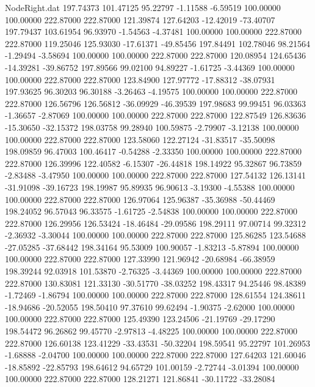 \begin{filecontents}{NodeRight.dat}
 197.74373  101.47125   95.22797    -1.11588   -6.59519  100.00000  100.00000  222.87000  222.87000  121.39874  127.64203  -12.42019  -73.40707
 197.79437  103.61954   96.93970    -1.54563   -4.37481  100.00000  100.00000  222.87000  222.87000  119.25046  125.93030  -17.61371  -49.85456
 197.84491  102.78046   98.21564    -1.29494   -3.58694  100.00000  100.00000  222.87000  222.87000  120.08954  124.65436  -14.39281  -39.86752
 197.89566   99.02100   94.89227    -1.61725   -3.44369  100.00000  100.00000  222.87000  222.87000  123.84900  127.97772  -17.88312  -38.07931
 197.93625   96.30203   96.30188    -3.26463   -4.19575  100.00000  100.00000  222.87000  222.87000  126.56796  126.56812  -36.09929  -46.39539
 197.98683   99.99451   96.03363    -1.36657   -2.87069  100.00000  100.00000  222.87000  222.87000  122.87549  126.83636  -15.30650  -32.15372
 198.03758   99.28940  100.59875    -2.79907   -3.12138  100.00000  100.00000  222.87000  222.87000  123.58060  122.27124  -31.83517  -35.50098
 198.09859   96.47003  100.46417    -0.54288   -2.33350  100.00000  100.00000  222.87000  222.87000  126.39996  122.40582   -6.15307  -26.44818
 198.14922   95.32867   96.73859    -2.83488   -3.47950  100.00000  100.00000  222.87000  222.87000  127.54132  126.13141  -31.91098  -39.16723
 198.19987   95.89935   96.90613    -3.19300   -4.55388  100.00000  100.00000  222.87000  222.87000  126.97064  125.96387  -35.36988  -50.44469
 198.24052   96.57043   96.33575    -1.61725   -2.54838  100.00000  100.00000  222.87000  222.87000  126.29956  126.53424  -18.46484  -29.09586
 198.29111   97.00714   99.32312    -2.36932   -3.30044  100.00000  100.00000  222.87000  222.87000  125.86285  123.54688  -27.05285  -37.68442
 198.34164   95.53009  100.90057    -1.83213   -5.87894  100.00000  100.00000  222.87000  222.87000  127.33990  121.96942  -20.68984  -66.38959
 198.39244   92.03918  101.53870    -2.76325   -3.44369  100.00000  100.00000  222.87000  222.87000  130.83081  121.33130  -30.51770  -38.03252
 198.43317   94.25446   98.48389    -1.72469   -1.86794  100.00000  100.00000  222.87000  222.87000  128.61554  124.38611  -18.94686  -20.52055
 198.50410   97.37610   99.62494    -1.90375   -2.62000  100.00000  100.00000  222.87000  222.87000  125.49390  123.24506  -21.19769  -29.17290
 198.54472   96.26862   99.45770    -2.97813   -4.48225  100.00000  100.00000  222.87000  222.87000  126.60138  123.41229  -33.43531  -50.32204
 198.59541   95.22797  101.26953    -1.68888   -2.04700  100.00000  100.00000  222.87000  222.87000  127.64203  121.60046  -18.85892  -22.85793
 198.64612   94.65729  101.00159    -2.72744   -3.01394  100.00000  100.00000  222.87000  222.87000  128.21271  121.86841  -30.11722  -33.28084

\end{filecontents}
